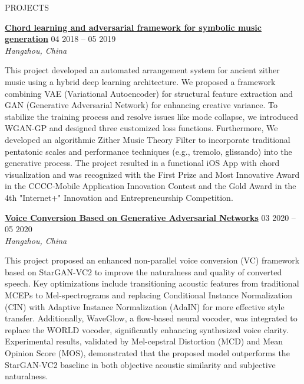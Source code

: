 \documentclass{resume}
\begin{document}
\vspace{-1em}
\begin{rSection}{PROJECTS}
\vspace{-1.25em}
    \item \textbf{\href{https://docs.google.com/presentation/d/1797idRRmgeD2JnUslGbflmGUO2X5lMY6/edit?usp=drive_link&ouid=101248488395326982475&rtpof=true&sd=true}{\textbf{\large{\underline{Chord learning and adversarial framework for symbolic music generation}}}}} \hfill {04 2018 -- 05 2019}\\
    \mbox{} \hfill \textit{Hangzhou, China}

    This project developed an automated arrangement system for ancient zither music using a hybrid deep learning architecture. 
    We proposed a framework combining VAE (Variational Autoencoder) for structural feature extraction and GAN (Generative Adversarial Network) for enhancing creative variance. 
    To stabilize the training process and resolve issues like mode collapse, we introduced WGAN-GP and designed three customized loss functions. 
    Furthermore, We developed an algorithmic Zither Music Theory Filter to incorporate traditional pentatonic scales and performance techniques (e.g., tremolo, glissando) into the generative process. 
    The project resulted in a functional iOS App with chord visualization and was recognized with the First Prize and Most Innovative Award in the CCCC-Mobile Application Innovation Contest and 
    the Gold Award in the 4th "Internet+" Innovation and Entrepreneurship Competition.

    \item \textbf{\href{https://drive.google.com/file/d/1736XHtaeT58FL_gbOa9XjlyA6xAXDkg2/view?usp=drive_link}{\textbf{\large{\underline{Voice Conversion Based on Generative Adversarial Networks}}}}} \hfill {03 2020 -- 05 2020}\\
    \mbox{} \hfill \textit{Hangzhou, China}

    This project proposed an enhanced non-parallel voice conversion (VC) framework based on StarGAN-VC2 to improve the naturalness and quality of converted speech. 
    Key optimizations include transitioning acoustic features from traditional MCEPs to Mel-spectrograms and 
    replacing Conditional Instance Normalization (CIN) with Adaptive Instance Normalization (AdaIN) for more effective style transfer. 
    Additionally, WaveGlow, a flow-based neural vocoder, was integrated to replace the WORLD vocoder, significantly enhancing synthesized voice clarity. 
    Experimental results, validated by Mel-cepstral Distortion (MCD) and Mean Opinion Score (MOS), demonstrated that the proposed model outperforms the StarGAN-VC2 baseline in both objective acoustic similarity and subjective naturalness.
    

\end{rSection}
\end{document}
